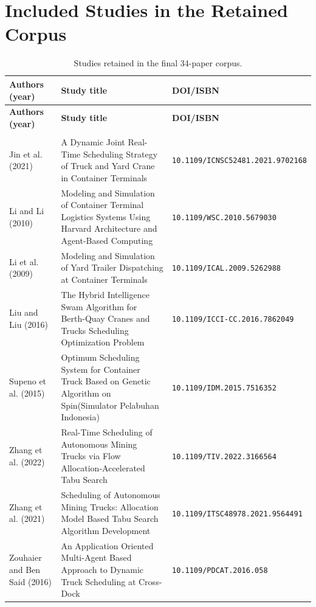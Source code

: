 \documentclass[preprint,12pt,number,longtitle]{elsarticle}
\begin{document}
\section{Included Studies in the Retained Corpus}
\label{app:included}

\footnotesize
\begin{longtable}{>{\raggedright\arraybackslash}p{} >{\raggedright\arraybackslash}p{} >{\raggedright\arraybackslash}p{}}
\caption{Studies retained in the final 34-paper corpus.}
\label{tab:included-studies}\\
\toprule
\textbf{Authors (year)} & \textbf{Study title} & \textbf{DOI/ISBN} \\
\midrule
\endfirsthead
\toprule
\textbf{Authors (year)} & \textbf{Study title} & \textbf{DOI/ISBN} \\
\midrule
\endhead
\midrule
\multicolumn{3}{r}{Continued on next page} \\
\endfoot
\bottomrule
\endlastfoot
Jin et al. (2021) & A Dynamic Joint Real-Time Scheduling Strategy of Truck and Yard Crane in Container Terminals & \nolinkurl{10.1109/ICNSC52481.2021.9702168} \\
Li and Li (2010) & Modeling and Simulation of Container Terminal Logistics Systems Using Harvard Architecture and Agent-Based Computing & \nolinkurl{10.1109/WSC.2010.5679030} \\
Li et al. (2009) & Modeling and Simulation of Yard Trailer Dispatching at Container Terminals & \nolinkurl{10.1109/ICAL.2009.5262988} \\
Liu and Liu (2016) & The Hybrid Intelligence Swam Algorithm for Berth-Quay Cranes and Trucks Scheduling Optimization Problem & \nolinkurl{10.1109/ICCI-CC.2016.7862049} \\
Supeno et al. (2015) & Optimum Scheduling System for Container Truck Based on Genetic Algorithm on Spin(Simulator Pelabuhan Indonesia) & \nolinkurl{10.1109/IDM.2015.7516352} \\
Zhang et al. (2022) & Real-Time Scheduling of Autonomous Mining Trucks via Flow Allocation-Accelerated Tabu Search & \nolinkurl{10.1109/TIV.2022.3166564} \\
Zhang et al. (2021) & Scheduling of Autonomous Mining Trucks: Allocation Model Based Tabu Search Algorithm Development & \nolinkurl{10.1109/ITSC48978.2021.9564491} \\
Zouhaier and Ben Said (2016) & An {{Application Oriented Multi-Agent Based Approach}} to {{Dynamic Truck Scheduling}} at {{Cross-Dock}} & \nolinkurl{10.1109/PDCAT.2016.058} \\

\end{longtable}
\end{document}
